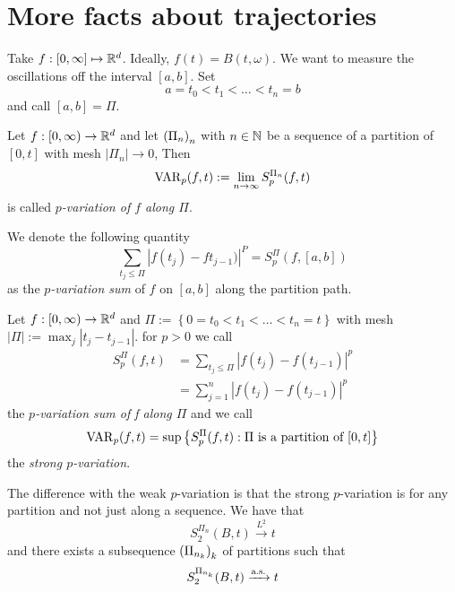 \documentclass[12pt]{report}
\begin{document}
\section{More facts about \bwm{} trajectories}
Take $f:[0,\infty]\mapsto\mathbb{R}^{d}$. Ideally, $f(t)=B(t,\omega)$. We want to measure the oscillations off the interval $[a,b]$. Set 
\begin{equation*}
	a=t_{0}<t_{1}<\ldots<t_{n}=b
\end{equation*}
and call $[a,b]=\Pi$.
\begin{definition}
	Let $f:[0,\infty)\to\mathbb{R}^{d}$ and let ${\left({\Pi}_{n}\right)}_{n}$ with $n\in\mathbb{N}$ be a sequence of a partition of $[0,t]$ with mesh $\left|\Pi_{n}\right|\to0$, Then 
	\begin{equation*}
		\mathrm{VAR}_{p}(f,t):=\lim_{n\to\infty}S^{\Pi_{n}}_{p}(f,t)
	\end{equation*}
	is called \emph{$p$-variation of $f$ along $\Pi$}.
\end{definition}
 We denote the following quantity
\begin{equation*}
	\sum_{t_{j}\leq\Pi}\left|f(t_{j})-ft_{j-1})\right|^{P}=S^{\Pi}_{p}(f,[a,b])
\end{equation*}
as the \emph{$p$-variation sum} of $f$ on $[a,b]$ along the partition path.
\begin{definition}
	Let $f:[0,\infty)\to\mathbb{R}^{d}$ and $\Pi:=\left\{
	0=t_{0}<t_{1}<\ldots<t_{n}=t\right\}$ with mesh $|\Pi|:=\max_{j}|t_{j}-t_{j-1}|$. for $p>0$ we call
	\begin{align*}
		S_{p}^{\Pi}(f,t)&=\sum_{t_{j}\leq\Pi}\left|f(t_{j})-f(t_{j-1})\right|^{p}\\
		&=\sum_{j=1}^{n}\left|f(t_{j})-f(t_{j-1})\right|^{p}
	\end{align*}
	the \emph{$p$-variation sum of f along $\Pi$} and we call
	\begin{equation*}
		\mathrm{VAR}_{p}(f,t)=\sup\left\{S^{\Pi}_{p}(f,t):\Pi\text{ is a partition of }[0,t]\right\}
	\end{equation*}
	the \emph{strong $p$-variation}.
\end{definition}
The difference with the weak $p$-variation is that the strong $p$-variation is for any partition and not just along a sequence. We have that
\begin{equation*}
	S_{2}^{\Pi_{n}}(B,t)\xrightarrow{L^{2}}t
\end{equation*}
and there exists a subsequence ${\left(\Pi_{n_{k}}\right)}_{k}$ of partitions such that
\begin{equation*}
	S^{\Pi_{n_{k}}}_{2}(B,t)\xrightarrow[]{\text{a.s.}} t
\end{equation*}
\end{document}
